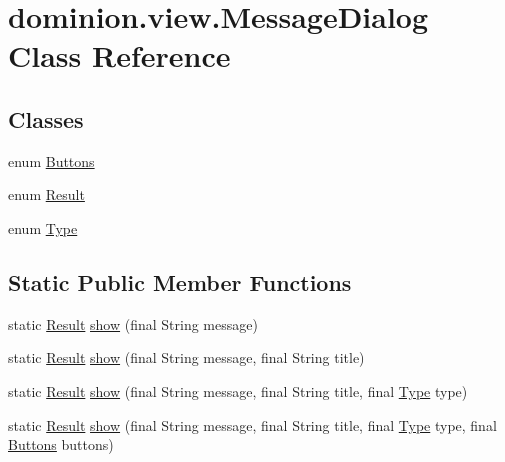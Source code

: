\hypertarget{classdominion_1_1view_1_1MessageDialog}{\section{dominion.\-view.\-Message\-Dialog \-Class \-Reference}
\label{classdominion_1_1view_1_1MessageDialog}
}
\subsection*{\-Classes}
\begin{DoxyCompactItemize}
\item 
enum \hyperlink{enumdominion_1_1view_1_1MessageDialog_1_1Buttons}{\-Buttons}
\item 
enum \hyperlink{enumdominion_1_1view_1_1MessageDialog_1_1Result}{\-Result}
\item 
enum \hyperlink{enumdominion_1_1view_1_1MessageDialog_1_1Type}{\-Type}
\end{DoxyCompactItemize}
\subsection*{\-Static \-Public \-Member \-Functions}
\begin{DoxyCompactItemize}
\item 
static \hyperlink{enumdominion_1_1view_1_1MessageDialog_1_1Result}{\-Result} \hyperlink{classdominion_1_1view_1_1MessageDialog_a2a1f9f190290ccbbcc8ff903bc1c7ede}{show} (final \-String message)
\item 
static \hyperlink{enumdominion_1_1view_1_1MessageDialog_1_1Result}{\-Result} \hyperlink{classdominion_1_1view_1_1MessageDialog_a0272a5b1f48e1e22cca3d6953f8483ff}{show} (final \-String message, final \-String title)
\item 
static \hyperlink{enumdominion_1_1view_1_1MessageDialog_1_1Result}{\-Result} \hyperlink{classdominion_1_1view_1_1MessageDialog_a24da64d2799f19999f08b00eeacc9d70}{show} (final \-String message, final \-String title, final \hyperlink{enumdominion_1_1view_1_1MessageDialog_1_1Type}{\-Type} type)
\item 
static \hyperlink{enumdominion_1_1view_1_1MessageDialog_1_1Result}{\-Result} \hyperlink{classdominion_1_1view_1_1MessageDialog_a5b0f1dea7ca521c29395d5a783bbb67f}{show} (final \-String message, final \-String title, final \hyperlink{enumdominion_1_1view_1_1MessageDialog_1_1Type}{\-Type} type, final \hyperlink{enumdominion_1_1view_1_1MessageDialog_1_1Buttons}{\-Buttons} buttons)
\end{DoxyCompactItemize}
